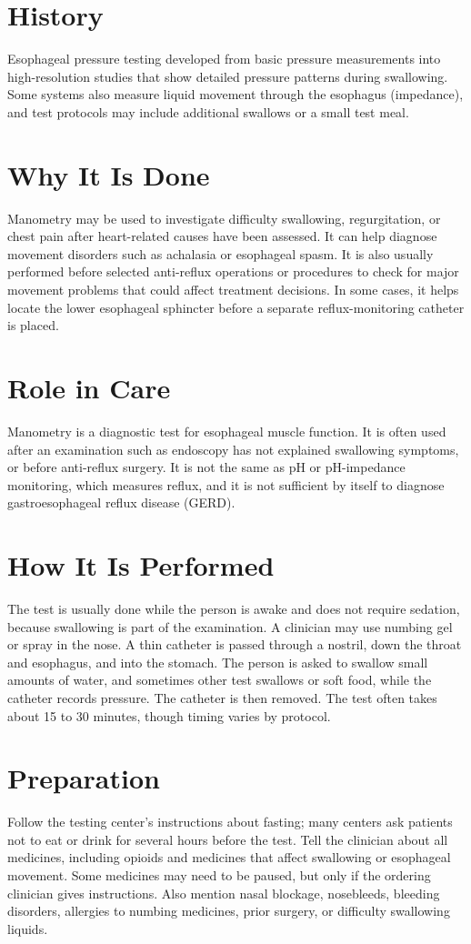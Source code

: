 \section*{History}
Esophageal pressure testing developed from basic pressure measurements into high-resolution studies that show detailed pressure patterns during swallowing. Some systems also measure liquid movement through the esophagus (impedance), and test protocols may include additional swallows or a small test meal.

\section*{Why It Is Done}
Manometry may be used to investigate difficulty swallowing, regurgitation, or chest pain after heart-related causes have been assessed. It can help diagnose movement disorders such as achalasia or esophageal spasm. It is also usually performed before selected anti-reflux operations or procedures to check for major movement problems that could affect treatment decisions. In some cases, it helps locate the lower esophageal sphincter before a separate reflux-monitoring catheter is placed.

\section*{Role in Care}
Manometry is a diagnostic test for esophageal muscle function. It is often used after an examination such as endoscopy has not explained swallowing symptoms, or before anti-reflux surgery. It is not the same as pH or pH-impedance monitoring, which measures reflux, and it is not sufficient by itself to diagnose gastroesophageal reflux disease (GERD).

\section*{How It Is Performed}
The test is usually done while the person is awake and does not require sedation, because swallowing is part of the examination. A clinician may use numbing gel or spray in the nose. A thin catheter is passed through a nostril, down the throat and esophagus, and into the stomach. The person is asked to swallow small amounts of water, and sometimes other test swallows or soft food, while the catheter records pressure. The catheter is then removed. The test often takes about 15 to 30 minutes, though timing varies by protocol.

\section*{Preparation}
Follow the testing center's instructions about fasting; many centers ask patients not to eat or drink for several hours before the test. Tell the clinician about all medicines, including opioids and medicines that affect swallowing or esophageal movement. Some medicines may need to be paused, but only if the ordering clinician gives instructions. Also mention nasal blockage, nosebleeds, bleeding disorders, allergies to numbing medicines, prior surgery, or difficulty swallowing liquids.


